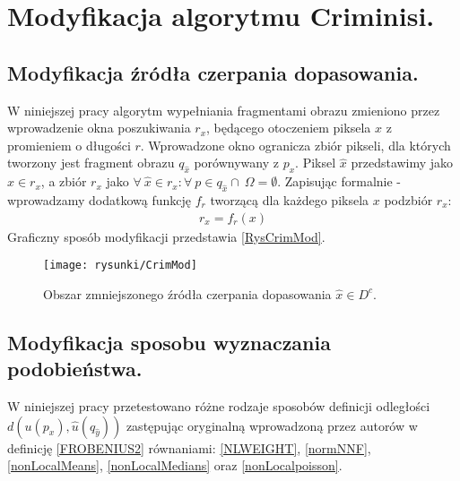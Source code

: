 \documentclass[12pt, twoside, openany]{report}
\theoremstyle{definition}
\begin{document}
\section{Modyfikacja algorytmu Criminisi.}
\label{ssec:crimMod}
\subsection{Modyfikacja źródła czerpania dopasowania.}
\label{ssec:crimModSource}
W niniejszej pracy algorytm wypełniania fragmentami obrazu zmieniono przez wprowadzenie okna poszukiwania $r_x$, będącego otoczeniem piksela $x$ z promieniem o długości $r$. Wprowadzone okno ogranicza zbiór pikseli, dla których tworzony jest fragment obrazu $q_{\hat{x}}$ porównywany z $p_{x}$.
Piksel $\hat{x}$ przedstawimy jako $\hat{x} \in r_x$, a zbiór $r_x$ jako 
$\forall \ \hat{x} \in r_x: \forall \ p \in q_{\hat{x}} \cap \ \Omega = \emptyset$. Zapisując formalnie - wprowadzamy dodatkową funkcję $f_r$ tworzącą dla każdego piksela $x$ podzbiór $r_x$:
\begin{align}
r_x = f_r(x)
\end{align}
Graficzny sposób modyfikacji przedstawia \autoref{RysCrimMod}.
\begin{figure}[!h]
	\centering
	\texttt{[image: rysunki/CrimMod]}
	\caption{Obszar zmniejszonego źródła czerpania dopasowania $\hat{x} \in D^c$.}
\label{RysCrimMod}
\end{figure}
\subsection{Modyfikacja sposobu wyznaczania podobieństwa.}
W niniejszej pracy przetestowano różne rodzaje sposobów definicji odległości $d\left( u(p_x), \hat{u} (q_{\hat{y}}) \right)$  zastępując oryginalną wprowadzoną przez autorów w \cite{criminisi2004region} definicję \eqref{FROBENIUS2} równaniami: \eqref{NLWEIGHT}, \eqref{normNNF}, \eqref{nonLocalMeans}, \eqref{nonLocalMedians} oraz \eqref{nonLocalpoisson}.
\end{document}
